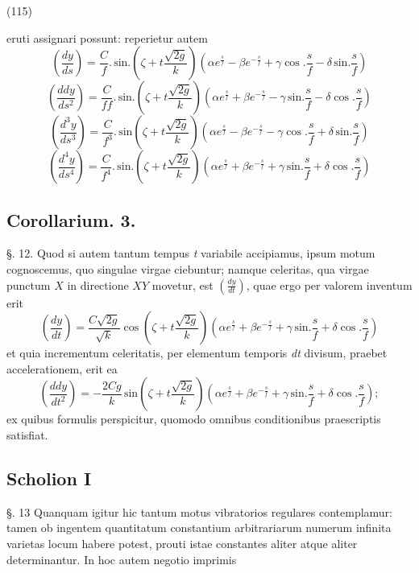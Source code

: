 \documentclass[11pt,a4paper]{article}
\begin{document}
(115)

eruti assignari possunt: reperietur autem
\[
\left(\frac{dy}{ds}\right) = \frac{C}{f}.\,\text{sin.}\left(\zeta + t\frac{\sqrt{2g}}{k}\right)\left(\alpha e^{\frac{s}{f}} - \beta e^{-\frac{s}{f}} + \gamma\cos.\frac{s}{f} - \delta\,\text{sin.}\frac{s}{f}\right)
\]
\[
\left(\frac{ddy}{ds^2}\right) = \frac{C}{ff}.\,\text{sin.}\left(\zeta + t\frac{\sqrt{2g}}{k}\right)\left(\alpha e^{\frac{s}{f}} + \beta e^{-\frac{s}{f}} - \gamma\,\text{sin.}\frac{s}{f} - \delta\cos.\frac{s}{f}\right)
\]
\[
\left(\frac{d^3y}{ds^3}\right) = \frac{C}{f^3}.\,\text{sin}\left(\zeta + t\frac{\sqrt{2g}}{k}\right)\left(\alpha e^{\frac{s}{f}} - \beta e^{-\frac{s}{f}} - \gamma\cos.\frac{s}{f} + \delta\,\text{sin.}\frac{s}{f}\right)
\]
\[
\left(\frac{d^4y}{ds^4}\right) = \frac{C}{f^4}.\,\text{sin.}\left(\zeta + t\frac{\sqrt{2g}}{k}\right)\left(\alpha e^{\frac{s}{f}} + \beta e^{-\frac{s}{f}} + \gamma\,\text{sin.}\frac{s}{f} + \delta\cos.\frac{s}{f}\right)
\]

\subsection{Corollarium. 3.}

§. 12. Quod si autem tantum tempus \emph{t} variabile accipiamus, ipsum
motum cognoscemus, quo singulae virgae ciebuntur; namque celeritas, qua
virgae punctum $X$ in directione $XY$ movetur, est
$\left(\frac{dy}{dt}\right)$, quae ergo per valorem inventum erit
\[
\left(\frac{dy}{dt}\right) = \frac{C\sqrt{2g}}{\sqrt{k}}\cos\left(\zeta + t\frac{\sqrt{2g}}{k}\right)\left(\alpha e^{\frac{s}{f}} + \beta e^{-\frac{s}{f}} + \gamma\,\text{sin.}\frac{s}{f} + \delta\cos.\frac{s}{f}\right)
\]
et quia incrementum celeritatis, per elementum temporis \emph{dt} divisum,
praebet accelerationem, erit ea
\[
\left(\frac{ddy}{dt^2}\right) = -\frac{2Cg}{k}\,\text{sin}\left(\zeta + t\frac{\sqrt{2g}}{k}\right)\left(\alpha e^{\frac{s}{f}} + \beta e^{-\frac{s}{f}} + \gamma\,\text{sin.}\frac{s}{f} + \delta\cos.\frac{s}{f}\right);
\]
ex quibus formulis perspicitur, quomodo omnibus conditionibus praescriptis
satisfiat.

\subsection{Scholion I}

§. 13 Quanquam igitur hic tantum motus vibratorios regulares contemplamur:
tamen ob ingentem quantitatum constantium arbitrariarum numerum infinita
varietas locum habere potest, prouti istae constantes aliter atque aliter
determinantur. In hoc autem negotio imprimis
\end{document}
